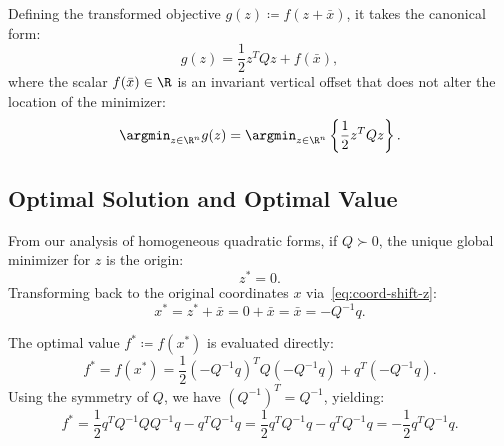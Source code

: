 Defining the transformed objective $g(z) \coloneqq f(z + \bar{x})$, it takes the canonical form:
\begin{equation}
    g(z) = \frac{1}{2} z^T Q z + f(\bar{x}),
\end{equation}
where the scalar $f(\bar{x}) \in \R$ is an invariant vertical offset that does not alter the location of the minimizer:
\begin{equation}
    \argmin_{z \in \R^n} g(z) = \argmin_{z \in \R^n} \left\{ \frac{1}{2} z^T Q z \right\}.
\end{equation}

\subsection{Optimal Solution and Optimal Value}
From our analysis of homogeneous quadratic forms, if $Q \succ 0$, the unique global minimizer for $z$ is the origin:
\begin{equation}
    z^* = 0.
\end{equation}
Transforming back to the original coordinates $x$ via~\eqref{eq:coord-shift-z}:
\begin{equation}
    x^* = z^* + \bar{x} = 0 + \bar{x} = \bar{x} = -Q^{-1} q.
\end{equation}

The optimal value $f^* \coloneqq f(x^*)$ is evaluated directly:
\begin{equation}
    f^* = f(x^*) = \frac{1}{2} (-Q^{-1} q)^T Q (-Q^{-1} q) + q^T (-Q^{-1} q).
\end{equation}
Using the symmetry of $Q$, we have $(Q^{-1})^T = Q^{-1}$, yielding:
\begin{equation}
    f^* = \frac{1}{2} q^T Q^{-1} Q Q^{-1} q - q^T Q^{-1} q = \frac{1}{2} q^T Q^{-1} q - q^T Q^{-1} q = -\frac{1}{2} q^T Q^{-1} q.
    \label{eq:optimal-value-non-singular}
\end{equation}

